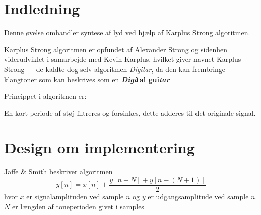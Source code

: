 \section{Indledning}

Denne øvelse omhandler syntese af lyd ved hjælp af Karplus Strong algoritmen. 

Karplus Strong algoritmen er opfundet af Alexander Strong og sidenhen viderudviklet i samarbejde med Kevin Karplus\cite{Karplus1983}, hvilket giver navnet Karplus Strong --- de kaldte dog selv algoritmen \emph{Digitar}, da den kan frembringe klangtoner som kan beskrives som en \textbf{\emph{Digi}tal gui\emph{tar}}

Princippet i algoritmen er: 

En kort periode af støj filtreres og forsinkes, dette adderes til  det originale signal.






\section{Design om implementering}


Jaffe \& Smith beskriver algoritmen 
\begin{equation}
    y[n] = x[n] + \frac{y[n - N] + y\left[n -(N + 1)\right]}{2} 
\end{equation}
hvor $x$ er signalamplituden ved sample $n$ og $y$ er udgangsamplitude ved sample $n$. 
$N$ er længden af toneperioden givet i samples \cite{Jaffe1983} 




